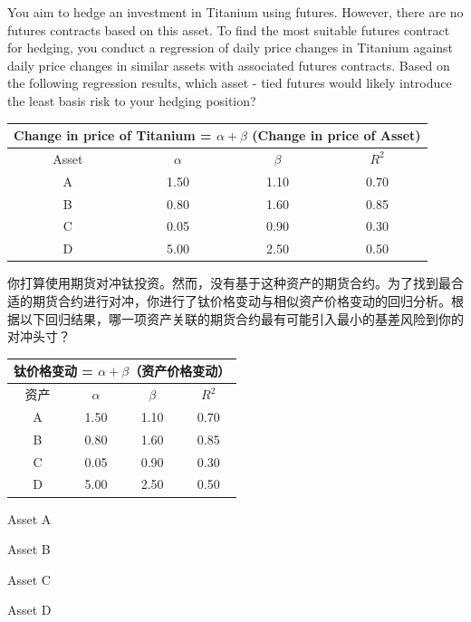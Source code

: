 \documentclass{article}
\newcounter{question} %
\begin{document}
\begin{question}
    You aim to hedge an investment in Titanium using futures. However, there are no futures contracts based on this asset. To find the most suitable futures contract for hedging, you conduct a regression of daily price changes in Titanium against daily price changes in similar assets with associated futures contracts. Based on the following regression results, which asset - tied futures would likely introduce the least basis risk to your hedging position?
    \begin{center}
    \begin{tabular}{|c|c|c|c|}
    \hline
    \multicolumn{4}{|c|}{Change in price of Titanium = $\alpha+\beta$ (Change in price of Asset)} \\ \hline
    Asset & $\alpha$ & $\beta$ & $R^{2}$ \\ \hline
    A & 1.50 & 1.10 & 0.70 \\ \hline
    B & 0.80 & 1.60 & 0.85 \\ \hline
    C & 0.05 & 0.90 & 0.30 \\ \hline
    D & 5.00 & 2.50 & 0.50 \\ \hline
    \end{tabular}
    \end{center}
    你打算使用期货对冲钛投资。然而，没有基于这种资产的期货合约。为了找到最合适的期货合约进行对冲，你进行了钛价格变动与相似资产价格变动的回归分析。根据以下回归结果，哪一项资产关联的期货合约最有可能引入最小的基差风险到你的对冲头寸？
    \begin{center}
        \begin{tabular}{|c|c|c|c|}
        \hline
        \multicolumn{4}{|c|}{钛价格变动 = $\alpha+\beta$（资产价格变动）} \\ \hline
        资产 & $\alpha$ & $\beta$ & $R^{2}$ \\ \hline
        A & 1.50 & 1.10 & 0.70 \\ \hline
        B & 0.80 & 1.60 & 0.85 \\ \hline
        C & 0.05 & 0.90 & 0.30 \\ \hline
        D & 5.00 & 2.50 & 0.50 \\ \hline
        \end{tabular}
        \end{center}
    \end{question}
    
    \begin{choices}
        \item Asset A
        \item Asset B
        \item Asset C
        \item Asset D
    \end{choices}
    
\end{document}
